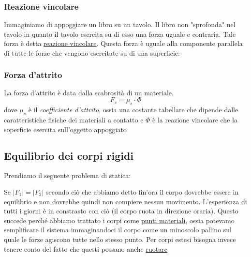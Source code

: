 \subsubsection{Reazione vincolare}
Immaginiamo di appoggiare un libro su un tavolo. Il libro non "sprofonda" nel tavolo in quanto il tavolo esercita su di esso una forza uguale e contraria. Tale forza è detta \underline{reazione vincolare}. Questa forza è uguale alla componente parallela di tutte le forze che vengono esercitate su di una superficie:
\vskip3mm
\begin{center}
\end{center}
\subsubsection{Forza d'attrito}
La forza d'attrito è data dalla scabrosità di un materiale.
\[
	F_s = \mu _s \cdot  \Phi
\]
dove $ \mu _s $ è il \textit{coefficiente d'attrito}, ossia una costante tabellare che dipende dalle caratteristiche fisiche dei materiali a contatto e $ \Phi  $ è la reazione vincolare che la soperficie esercita sull'oggetto appoggiato

\subsection{Equilibrio dei corpi rigidi}
Prendiamo il seguente problema di statica:
\vskip3mm
\begin{center}
\end{center}
\vskip3mm
Se $ \left|F_1\right| = \left|F_2\right| $ secondo ciò che abbiamo detto fin'ora il corpo dovrebbe essere in equilibrio e non dovrebbe quindi non compiere nessun movimento. L'esperienza di tutti i giorni è in constrasto con ciò (il corpo ruota in direzione oraria).
\vskip3mm
Questo succede perché abbiamo trattato i corpi come \underline{punti materiali}, ossia potevamo semplificare il sistema immaginandoci il corpo come un minoscolo pallino sul quale le forze agiscono tutte nello stesso punto. Per corpi estesi bisogna invece tenere conto del fatto che questi possano anche \underline{ruotare}

